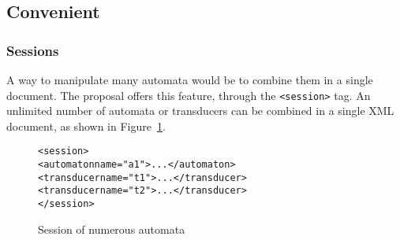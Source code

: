 \documentclass[a4paper]{article}
\newcommand{\Vauc}{{\sc Vaucanson}\xspace}
\begin{document}
\subsection{Convenient}

\subsubsection{Sessions}

A way to manipulate many automata would be to combine them in
a single document. The proposal offers this feature, through the
\verb|<session>| tag. An unlimited number of automata or transducers
can be combined in a single XML document, as shown in Figure~\ref{session1}.



{\small

\begin{figure}[h]
  \begin{center}
\begin{alltt}
<session>
  <automaton name="a1">...</automaton>
  <transducer name="t1">...</transducer>
  <transducer name="t2">...</transducer>
</session>
\end{alltt}

\caption{Session of numerous automata}
\label{session1}
  \end{center}
\end{figure}

}








\end{document}
